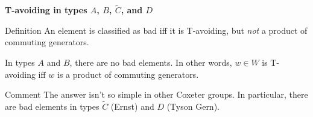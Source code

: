 \documentclass[9pt,handout]{beamer}
\newcommand{\<}{\langle}
\renewcommand{\>}{\rangle}
\begin{document}

\begin{frame}{\textbf{T-avoiding in types $A$, $B$, $\widetilde{C}$, and $D$}}

\begin{block}{Definition}
An element is classified as \alert{bad} iff it is T-avoiding, but \emph{not} a product of commuting generators.
\end{block}

\pause

\begin{theorem}
In types $A$ and $B$, there are no bad elements. In other words, $w\in W$ is T-avoiding iff $w$ is a product of commuting generators.
\end{theorem}

\pause

\begin{block}{Comment}
The answer isn't so simple in other Coxeter groups.  In particular, there are bad elements in types $\widetilde{C}$ (Ernst) and $D$ (Tyson Gern).
\end{block}
\end{frame}

\end{document}
